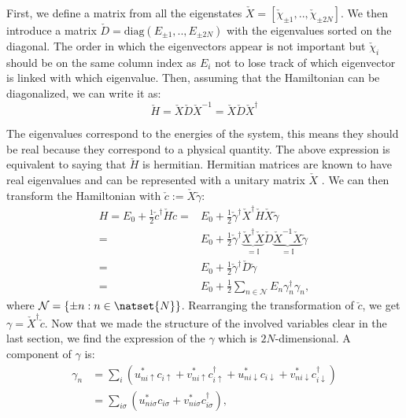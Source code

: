 \documentclass[../main.tex]{subfile}
\begin{document}
First, we define a matrix from all the eigenstates $\check{X} = [\check{\chi}_{\pm 1},..,\check{\chi}_{\pm 2N}]$.
We then introduce a matrix $\check{D} = \text{diag}(E_{\pm 1},..,E_{\pm 2N})$ with the eigenvalues sorted on the diagonal. The order in which the eigenvectors appear is not important
but $\check{\chi}_{i}$ should be on the same column index as $E_{i}$ not to lose track of which eigenvector is linked with which eigenvalue.
Then, assuming that the Hamiltonian can be diagonalized, we can write it as:
\begin{equation}\label{eq:Diag_Ham}
    \check{H} = \check{X}\check{D}\check{X}^{-1} = \check{X}\check{D}\check{X}^{\dagger} 
\end{equation}

The eigenvalues correspond to the energies of the system, this means they should be real because they correspond to a physical quantity. The above expression
is equivalent to saying that $\check{H}$ is hermitian. Hermitian matrices are known to have real eigenvalues and can be represented with a unitary matrix $\check{X}$ \cite{Terence}.
We can then transform the Hamiltonian with $\check{c} := \check{X}\check{\gamma}$:
\begin{align*}
    H = E_0 + \frac{1}{2}\check{c}^{\dagger}\check{H}\check{c} =& E_0 + \frac{1}{2}\check{\gamma}^{\dagger}\check{X}^{\dagger}\check{H}\check{X}\check{\gamma}\\
    =& E_0 +\frac{1}{2}\check{\gamma}^{\dagger}\underbrace{\check{X}^{\dagger} \check{X}}_{=\mathbb{I}}\check{D}\underbrace{\check{X}^{-1}\check{X}}_{=\mathbb{I}}\check{\gamma}\\
    =& E_0 + \frac{1}{2}\check{\gamma}^{\dagger}\check{D}\check{\gamma}\\
    =& E_0 + \frac{1}{2}\sum_{n\in\mathcal{N}}E_n \gamma_n^{\dagger}\gamma_n,
\end{align*}
where $\mathcal{N}= \{\pm n : n \in \natset{N}\}$.
Rearranging the transformation of $\check{c}$, we get $\gamma = \check{X}^{\dagger}\check{c}$.   
Now that we made the structure of the involved variables clear in the last section, we find the expression of the $\gamma$ which is $2N$-dimensional. A component of $\gamma$ is:
\begin{align*}
    \gamma_n &= \sum_{i} \left( u_{ni\uparrow}^{\ast}c_{i\uparrow}+ v_{ni\uparrow}^{\ast}c_{i\uparrow}^{\dagger} +  u_{ni\downarrow}^{\ast}c_{i\downarrow}+ v_{ni\downarrow}^{\ast}c_{i\downarrow}^{\dagger}\right)\\
        &=  \sum_{i\sigma} \left( u_{ni\sigma}^{\ast}c_{i\sigma}+ v_{ni\sigma}^{\ast}c_{i\sigma}^{\dagger}\right),
\end{align*}
\end{document}

